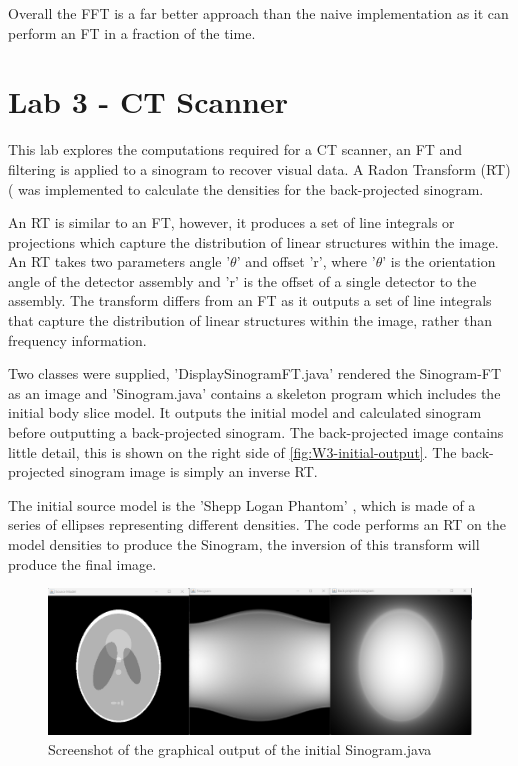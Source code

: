     Overall the FFT is a far better approach than the naive implementation as it can perform an FT in a fraction of the time.
    
\newpage
\section{Lab 3 - CT Scanner}

This lab explores the computations required for a CT scanner, an FT and filtering is applied to a sinogram to recover visual data. A Radon Transform (RT) (\textcite{4307775} was implemented to calculate the densities for the back-projected sinogram. 

An RT is similar to an FT, however, it produces a set of line integrals or projections which capture the distribution of linear structures within the image. An RT takes two parameters angle '$\theta$' and offset 'r', where '$\theta$' is the orientation angle of the detector assembly and 'r' is the offset of a single detector to the assembly. The transform differs from an FT as it outputs a set of line integrals that capture the distribution of linear structures within the image, rather than frequency information.

Two classes were supplied, 'DisplaySinogramFT.java' rendered the Sinogram-FT as an image and 'Sinogram.java' contains a skeleton program which includes the initial body slice model. It outputs the initial model and calculated sinogram before outputting a back-projected sinogram. The back-projected image contains little detail, this is shown on the right side of \autoref{fig:W3-initial-output}. The back-projected sinogram image is simply an inverse RT.

The initial source model is the 'Shepp Logan Phantom' \textcite{6499235}, which is made of a series of ellipses representing different densities. The code performs an RT on the model densities to produce the Sinogram, the inversion of this transform will produce the final image. 


\begin{figure}[H] 
    \centering
    \includegraphics[width=0.9\columnwidth]{Figures/Week 3/initial-graphics.png}
    \caption{Screenshot of the graphical output of the initial Sinogram.java}
    \label{fig:W3-initial-output}
\end{figure}


